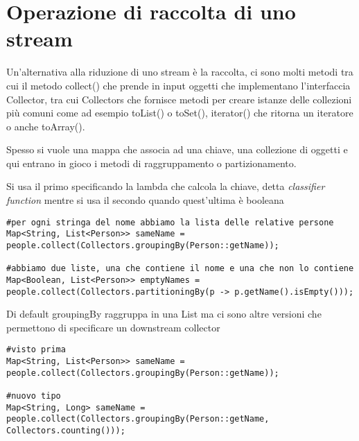 \section{Operazione di raccolta di uno stream}

Un'alternativa alla riduzione di uno stream è la raccolta, ci sono molti metodi tra cui il metodo collect() che prende in input oggetti che implementano l'interfaccia
Collector, tra cui Collectors che fornisce metodi per creare istanze delle collezioni più comuni come ad esempio toList() o toSet(), iterator() che ritorna un iteratore
o anche toArray().

Spesso si vuole una mappa che associa ad una chiave, una collezione di oggetti e qui entrano in gioco i metodi di raggruppamento o partizionamento.

Si usa il primo specificando la lambda che calcola la chiave, detta \textit{classifier function} mentre si usa il secondo quando quest'ultima è booleana
\begin{lstlisting}
#per ogni stringa del nome abbiamo la lista delle relative persone
Map<String, List<Person>> sameName = people.collect(Collectors.groupingBy(Person::getName));

#abbiamo due liste, una che contiene il nome e una che non lo contiene
Map<Boolean, List<Person>> emptyNames = people.collect(Collectors.partitioningBy(p -> p.getName().isEmpty()));
\end{lstlisting}

Di default groupingBy raggruppa in una List ma ci sono altre versioni che permettono di specificare un downstream collector
\begin{lstlisting}
#visto prima
Map<String, List<Person>> sameName = people.collect(Collectors.groupingBy(Person::getName));

#nuovo tipo
Map<String, Long> sameName = people.collect(Collectors.groupingBy(Person::getName, Collectors.counting()));
\end{lstlisting}